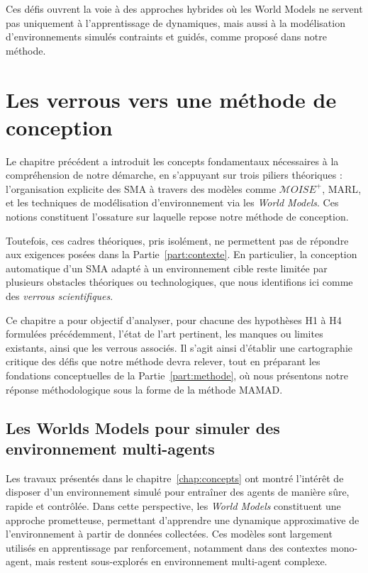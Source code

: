 Ces défis ouvrent la voie à des approches hybrides où les World Models ne servent pas uniquement à l'apprentissage de dynamiques, mais aussi à la modélisation d'environnements simulés contraints et guidés, comme proposé dans notre méthode.

\chapter{Les verrous vers une méthode de conception}
\label{chap:verrous}

\noindent
Le chapitre précédent a introduit les concepts fondamentaux nécessaires à la compréhension de notre démarche, en s'appuyant sur trois piliers théoriques : l'organisation explicite des \ac{SMA} à travers des modèles comme \textit{$\mathcal{M}OISE^+$}, \ac{MARL}, et les techniques de modélisation d'environnement via les \textit{World Models}. Ces notions constituent l'ossature sur laquelle repose notre méthode de conception.

Toutefois, ces cadres théoriques, pris isolément, ne permettent pas de répondre aux exigences posées dans la Partie~\autoref{part:contexte}. En particulier, la conception automatique d'un \ac{SMA} adapté à un environnement cible reste limitée par plusieurs obstacles théoriques ou technologiques, que nous identifions ici comme des \textit{verrous scientifiques}.

Ce chapitre a pour objectif d'analyser, pour chacune des hypothèses H1 à H4 formulées précédemment, l'état de l'art pertinent, les manques ou limites existants, ainsi que les verrous associés. Il s'agit ainsi d'établir une cartographie critique des défis que notre méthode devra relever, tout en préparant les fondations conceptuelles de la Partie~\autoref{part:methode}, où nous présentons notre réponse méthodologique sous la forme de la méthode \ac{MAMAD}.


\section{Les Worlds Models pour simuler des environnement multi-agents}

\noindent
Les travaux présentés dans le chapitre~\autoref{chap:concepts} ont montré l'intérêt de disposer d'un environnement simulé pour entraîner des agents de manière sûre, rapide et contrôlée. Dans cette perspective, les \textit{World Models} constituent une approche prometteuse, permettant d'apprendre une dynamique approximative de l'environnement à partir de données collectées. Ces modèles sont largement utilisés en apprentissage par renforcement, notamment dans des contextes mono-agent, mais restent sous-explorés en environnement multi-agent complexe.

